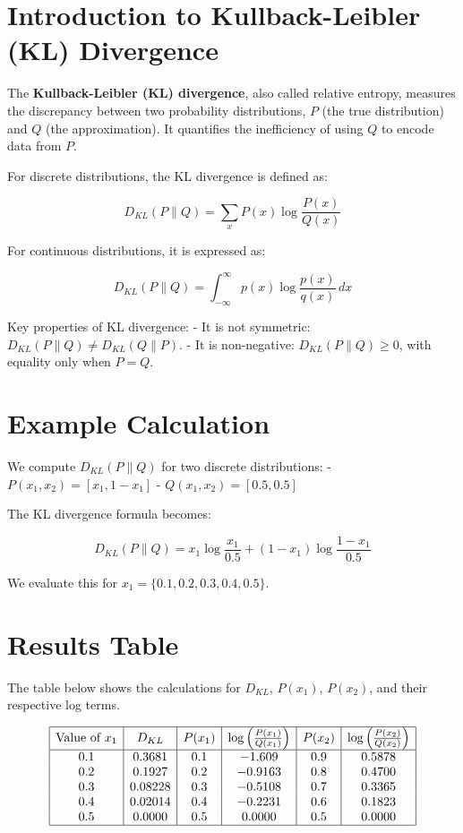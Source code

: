 \documentclass[
  12 pt,
  a4paper,
]{book}
\numberwithin{equation}{section}
\theoremstyle{plain}      %
\theoremstyle{definition} %
\theoremstyle{remark}     %
\theoremstyle{note}         %
\begin{document}
\newpage

\hypertarget{introduction-to-kullback-leibler-kl-divergence}{%
\section{Introduction to Kullback-Leibler (KL)
Divergence}\label{introduction-to-kullback-leibler-kl-divergence}}

The \textbf{Kullback-Leibler (KL) divergence}, also called relative
entropy, measures the discrepancy between two probability distributions,
\(P\) (the true distribution) and \(Q\) (the approximation). It
quantifies the inefficiency of using \(Q\) to encode data from \(P\).

For discrete distributions, the KL divergence is defined as:

\[
D_{KL}(P \| Q) = \sum_{x} P(x) \log \frac{P(x)}{Q(x)}
\]

For continuous distributions, it is expressed as:

\[
D_{KL}(P \| Q) = \int_{-\infty}^\infty p(x) \log \frac{p(x)}{q(x)} \, dx
\]

Key properties of KL divergence: - It is not symmetric:
\(D_{KL}(P \| Q) \neq D_{KL}(Q \| P)\). - It is non-negative:
\(D_{KL}(P \| Q) \geq 0\), with equality only when \(P = Q\).

\hypertarget{example-calculation}{%
\section{Example Calculation}\label{example-calculation}}

We compute \(D_{KL}(P \| Q)\) for two discrete distributions: -
\(P(x_1, x_2) = [x_1, 1-x_1]\) - \(Q(x_1, x_2) = [0.5, 0.5]\)

The KL divergence formula becomes:

\[
D_{KL}(P \| Q) = x_1 \log \frac{x_1}{0.5} + (1 - x_1) \log \frac{1 - x_1}{0.5}
\]

We evaluate this for \(x_1 = \{0.1, 0.2, 0.3, 0.4, 0.5\}\).

\hypertarget{results-table}{%
\section{Results Table}\label{results-table}}

The table below shows the calculations for \(D_{KL}\), \(P(x_1)\),
\(P(x_2)\), and their respective log terms.

\[
\begin{array}{|c|c|c|c|c|c|}
\hline
\text{Value of } x_1 & D_{KL} & P(x_1) & \log \left(\frac{P(x_1)}{Q(x_1)}\right) & P(x_2) & \log \left(\frac{P(x_2)}{Q(x_2)}\right) \\
\hline
0.1 & 0.3681 & 0.1 & -1.609 & 0.9 & 0.5878 \\
0.2 & 0.1927 & 0.2 & -0.9163 & 0.8 & 0.4700 \\
0.3 & 0.08228 & 0.3 & -0.5108 & 0.7 & 0.3365 \\
0.4 & 0.02014 & 0.4 & -0.2231 & 0.6 & 0.1823 \\
0.5 & 0.0000 & 0.5 & 0.0000 & 0.5 & 0.0000 \\
\hline
\end{array}
\]
\end{document}

